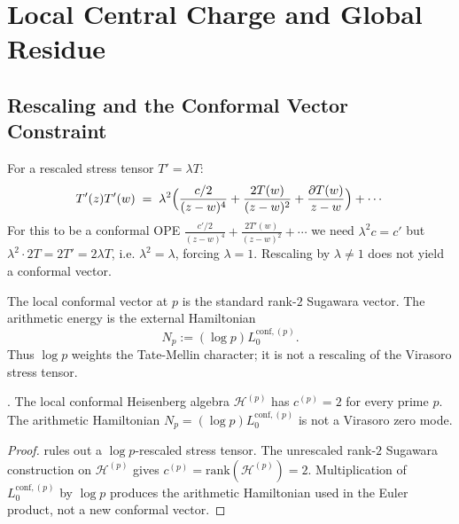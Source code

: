 \chapter{Local Central Charge and Global Residue}
\label{v4-arith:polyakov}

\section{Rescaling and the Conformal Vector Constraint}
\label{v4-arith:pol:rescaling-not-conformal}

\begin{observation}
\label{v4-arith:obs:rescaling-breaks-virasoro}
For a rescaled stress tensor \(T'=\lambda T\):
\begin{equation*}
T'(z)T'(w)\;=\;\lambda^{2}\Bigl(\frac{c/2}{(z-w)^{4}}+\frac{2T(w)}{(z-w)^{2}}+\frac{\partial T(w)}{z-w}\Bigr)+\cdots
\end{equation*}
For this to be a conformal OPE
\(\tfrac{c'/2}{(z-w)^{4}}+\tfrac{2T'(w)}{(z-w)^{2}}+\cdots\) we need
\(\lambda^{2}c=c'\) but \(\lambda^{2}\cdot 2T=2T'=2\lambda T\), i.e.
\(\lambda^{2}=\lambda\), forcing \(\lambda=1\). Rescaling by
\(\lambda\neq 1\) does not yield a conformal vector.
\end{observation}

\begin{remark}
The local conformal vector at \(p\) is the standard rank-\(2\)
Sugawara vector. The arithmetic energy is the external Hamiltonian
\[
N_{p}:=(\log p)L_{0}^{\mathrm{conf},(p)}.
\]
Thus \(\log p\) weights the Tate-Mellin character; it is not a
rescaling of the Virasoro stress tensor.
\end{remark}

\begin{theorem}
\label{v4-arith:thm:per-prime-c}
\ClaimStatusProvedHere. The local conformal Heisenberg algebra
\(\mathcal{H}^{(p)}\) has \(c^{(p)}=2\) for every prime \(p\). The
arithmetic Hamiltonian \(N_{p}=(\log p)L_{0}^{\mathrm{conf},(p)}\) is
not a Virasoro zero mode.
\end{theorem}

\begin{proof}
 rules out a
\(\log p\)-rescaled stress tensor. The unrescaled rank-\(2\)
Sugawara construction on \(\mathcal{H}^{(p)}\) gives
\(c^{(p)}=\mathrm{rank}(\mathcal H^{(p)})=2\). Multiplication of
\(L_{0}^{\mathrm{conf},(p)}\) by \(\log p\) produces the arithmetic
Hamiltonian used in the Euler product, not a new conformal vector.
\end{proof}

